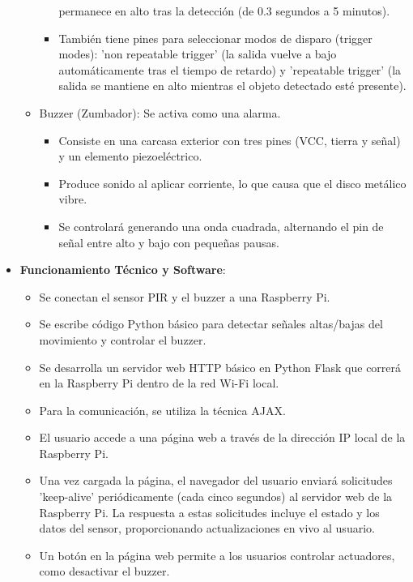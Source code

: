 \documentclass{report}
\begin{document}
\begin{itemize}
\begin{itemize}
\begin{itemize}
                permanece en alto tras la detección (de 0.3 segundos a 5 minutos).
                \item También tiene pines para seleccionar modos de disparo (trigger modes): 'non repeatable trigger' (la salida vuelve a bajo 
                automáticamente tras el tiempo de retardo) y  'repeatable trigger' (la salida se mantiene en alto mientras el objeto 
                detectado esté presente).
            \end{itemize}
        \item Buzzer (Zumbador): Se activa como una alarma.
            \begin{itemize}
                \item Consiste en una carcasa exterior con tres pines (VCC, tierra y señal) y un elemento piezoeléctrico.
                \item Produce sonido al aplicar corriente, lo que causa que el disco metálico vibre.
                \item Se controlará generando una onda cuadrada, alternando el pin de señal entre alto y bajo con pequeñas pausas.
            \end{itemize}
    \end{itemize}
    \item \textbf{Funcionamiento Técnico y Software}:
    \begin{itemize}
        \item Se conectan el sensor PIR y el buzzer a una Raspberry Pi.
        \item Se escribe código Python básico para detectar señales altas/bajas del movimiento y controlar el buzzer.
        \item Se desarrolla un servidor web HTTP básico en Python Flask que correrá en la Raspberry Pi dentro de la red Wi-Fi local.
        \item Para la comunicación, se utiliza la técnica AJAX.
        \item El usuario accede a una página web a través de la dirección IP local de la Raspberry Pi.
        \item Una vez cargada la página, el navegador del usuario enviará solicitudes 'keep-alive' periódicamente (cada cinco segundos) 
        al servidor web de la Raspberry Pi. La respuesta a estas solicitudes incluye el estado y los datos del sensor, proporcionando 
        actualizaciones en vivo al usuario.
        \item Un botón en la página web permite a los usuarios controlar actuadores, como desactivar el buzzer.

\end{itemize}
\end{itemize}
\end{document}
